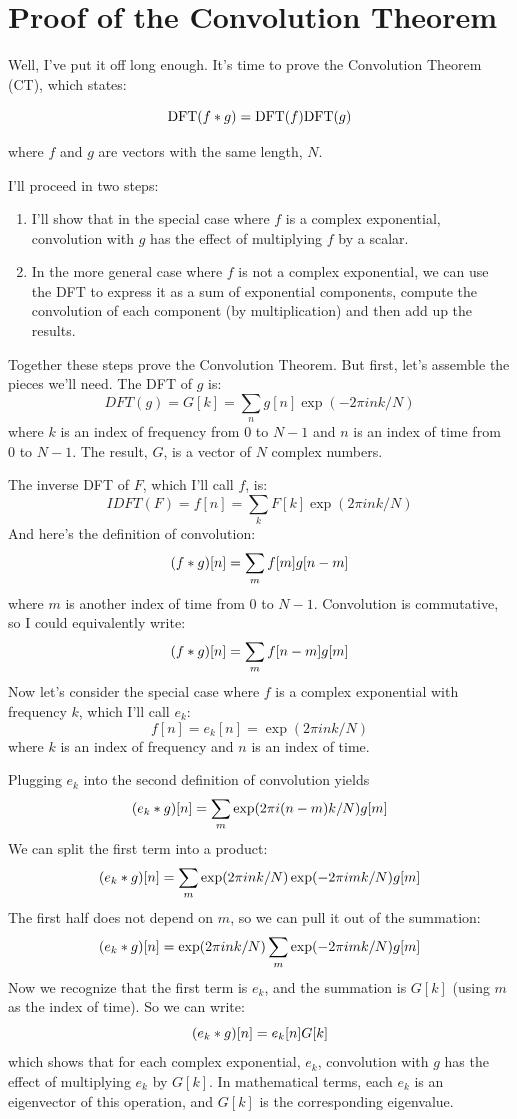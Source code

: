 \documentclass[12pt]{book}
\begin{document}
\section{Proof of the Convolution Theorem}

Well, I've put it off long enough.  It's time to prove the Convolution
Theorem (CT), which states:

\[ \mathrm{DFT}(f \ast g) = \mathrm{DFT}(f) \mathrm{DFT}(g) \]

where $f$ and $g$ are vectors with the same length, $N$.

I'll proceed in two steps:

\begin{enumerate}

\item I'll show that in the special case where $f$ is a complex
exponential, convolution with $g$ has the effect of multiplying
$f$ by a scalar.  

\item In the more general case where $f$ is not a complex exponential,
we can use the DFT to express it as a sum of exponential components,
compute the convolution of each component (by multiplication) and
then add up the results.

\end{enumerate}

Together these steps prove the Convolution Theorem.  But first, let's
assemble the pieces we'll need.  The DFT of $g$ is:
%
\[ DFT(g) = G[k] = \sum_n g[n] \exp(-2 \pi i n k / N) \]
%
where $k$ is an index of frequency from
0 to $N-1$ and $n$ is an index of time from 0 to $N-1$.
The result, $G$, is a vector of $N$ complex numbers.

The inverse DFT of $F$, which I'll call $f$, is:
%
\[ IDFT(F) = f[n] = \sum_k F[k] \exp(2 \pi i n k / N) \]
%
And here's the definition of convolution:
%
\[ (f \ast g)[n] = \sum_m f[m] g[n-m] \]
%
where $m$ is another index of time from 0 to $N-1$.
Convolution is commutative, so I could equivalently write:
%
\[ (f \ast g)[n] = \sum_m f[n-m] g[m] \]
%
Now let's consider the special case where $f$ is a complex
exponential with frequency $k$, which I'll call $e_k$:
%
\[ f[n] = e_k[n] = \exp(2 \pi i n k / N) \]
%
where $k$ is an index of frequency and $n$ is an index of time.

Plugging $e_k$ into the second definition of convolution yields
%
\[ (e_k \ast g)[n] = \sum_m \exp(2 \pi i (n-m) k / N) g[m]  \]
%
We can split the first term into a product:
%
\[ (e_k \ast g)[n] = \sum_m \exp(2 \pi i n k / N) \exp(-2 \pi i m k / N) g[m]  \]
%
The first half does not depend on $m$, so we can pull it out of the
summation:
%
\[ (e_k \ast g)[n] = \exp(2 \pi i n k / N) \sum_m \exp(-2 \pi i m k / N) g[m]  \]
%
Now we recognize that the first term is $e_k$, and the summation is
$G[k]$ (using $m$ as the index of time).  So we can write:
%
\[ (e_k \ast g)[n] = e_k[n] G[k] \]
%
which shows that for each complex exponential, $e_k$, convolution
with $g$ has the effect of multiplying $e_k$ by $G[k]$.  In mathematical
terms, each $e_k$ is an eigenvector of this operation, and
$G[k]$ is the corresponding eigenvalue.
\end{document}
